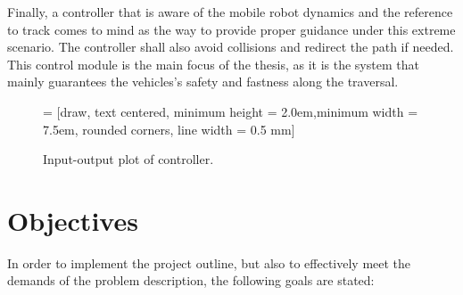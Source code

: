 Finally, a controller that is aware of the mobile robot dynamics and the reference to track comes to mind as the way to provide proper guidance under this extreme scenario. The controller shall also avoid collisions and redirect the path if needed. This control module is the main focus of the thesis, as it is the system that mainly guarantees the vehicles's safety and fastness along the traversal.

\begin{figure}[!h]
	\centering
	 = [draw, text centered, minimum height = 2.0em,minimum width = 7.5em, rounded corners, line width = 0.5 mm]
	
	\caption{Input-output plot of controller.}
    \label{fig:controlleroutline}
\end{figure}

\section{Objectives}
\label{section:objectives}

In order to implement the project outline, but also to effectively meet the demands of the problem description, the following goals are stated:

